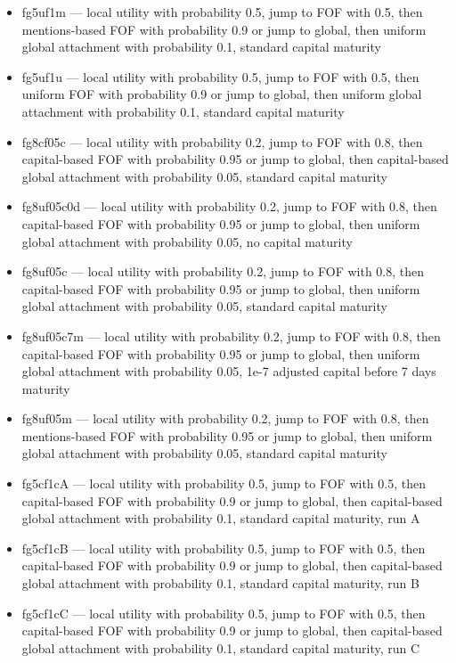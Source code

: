\documentclass[10pt,oneside]{memoir}
\begin{document}
\begin{itemize}
\item fg5uf1m --- local utility with probability 0.5, jump to FOF with 0.5, then mentions-based FOF with probability 0.9 or jump to global, then uniform global attachment with probability 0.1, standard capital maturity

\item fg5uf1u --- local utility with probability 0.5, jump to FOF with 0.5, then uniform FOF with probability 0.9 or jump to global, then uniform global attachment with probability 0.1, standard capital maturity

\item fg8cf05c --- local utility with probability 0.2, jump to FOF with 0.8, then capital-based FOF with probability 0.95 or jump to global, then capital-based global attachment with probability 0.05, standard capital maturity

\item fg8uf05c0d --- local utility with probability 0.2, jump to FOF with 0.8, then capital-based FOF with probability 0.95 or jump to global, then uniform global attachment with probability 0.05, no capital maturity

\item fg8uf05c --- local utility with probability 0.2, jump to FOF with 0.8, then capital-based FOF with probability 0.95 or jump to global, then uniform global attachment with probability 0.05, standard capital maturity

\item fg8uf05c7m --- local utility with probability 0.2, jump to FOF with 0.8, then capital-based FOF with probability 0.95 or jump to global, then uniform global attachment with probability 0.05, 1e-7 adjusted capital before 7 days maturity

\item fg8uf05m --- local utility with probability 0.2, jump to FOF with 0.8, then mentions-based FOF with probability 0.95 or jump to global, then uniform global attachment with probability 0.05, standard capital maturity

\item fg5cf1cA --- local utility with probability 0.5, jump to FOF with 0.5, then capital-based FOF with probability 0.9 or jump to global, then capital-based global attachment with probability 0.1, standard capital maturity, run A

\item fg5cf1cB --- local utility with probability 0.5, jump to FOF with 0.5, then capital-based FOF with probability 0.9 or jump to global, then capital-based global attachment with probability 0.1, standard capital maturity, run B

\item fg5cf1cC --- local utility with probability 0.5, jump to FOF with 0.5, then capital-based FOF with probability 0.9 or jump to global, then capital-based global attachment with probability 0.1, standard capital maturity, run C
\end{itemize}
\end{document}
